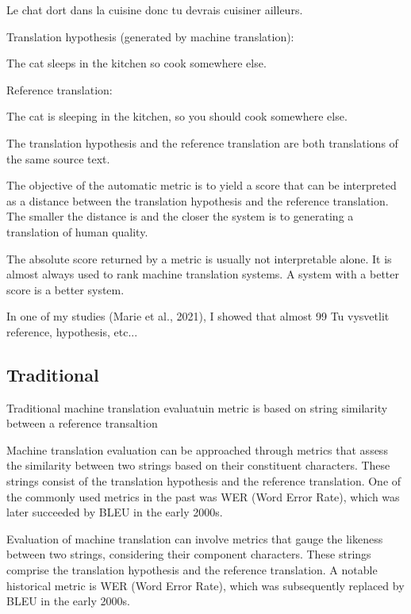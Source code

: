Le chat dort dans la cuisine donc tu devrais cuisiner ailleurs.

    Translation hypothesis (generated by machine translation):

The cat sleeps in the kitchen so cook somewhere else.

    Reference translation:

The cat is sleeping in the kitchen, so you should cook somewhere else.

The translation hypothesis and the reference translation are both translations of the same source text.

The objective of the automatic metric is to yield a score that can be interpreted as a distance between the translation hypothesis and the reference translation. The smaller the distance is and the closer the system is to generating a translation of human quality.

The absolute score returned by a metric is usually not interpretable alone. It is almost always used to rank machine translation systems. A system with a better score is a better system.

In one of my studies (Marie et al., 2021), I showed that almost 99%
Tu vysvetlit reference, hypothesis, etc...

\subsection{Traditional}
Traditional machine translation evaluatuin metric is based on string similarity between a reference transaltion 

Machine translation evaluation can be approached through metrics that assess the similarity between two strings based on their constituent characters. These strings consist of the translation hypothesis and the reference translation. One of the commonly used metrics in the past was WER (Word Error Rate), which was later succeeded by BLEU in the early 2000s.



Evaluation of machine translation can involve metrics that gauge the likeness between two strings, considering their component characters. These strings comprise the translation hypothesis and the reference translation. A notable historical metric is WER (Word Error Rate), which was subsequently replaced by BLEU in the early 2000s.


